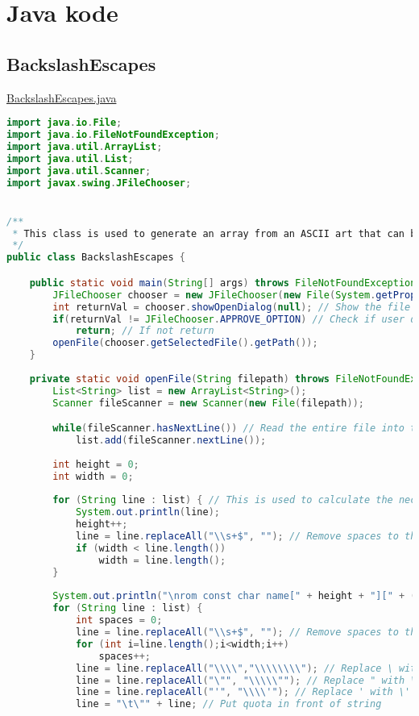 \chapter{Java kode}

\section{BackslashEscapes}
\label{BackslashEscapes}

\underline{BackslashEscapes.java}
\begin{lstlisting}[language=Java]
import java.io.File;
import java.io.FileNotFoundException;
import java.util.ArrayList;
import java.util.List;
import java.util.Scanner;
import javax.swing.JFileChooser;


/**
 * This class is used to generate an array from an ASCII art that can be put directly into the .c file.
 */
public class BackslashEscapes {

	public static void main(String[] args) throws FileNotFoundException {
		JFileChooser chooser = new JFileChooser(new File(System.getProperty("user.home"))); // Create the FileChooser instance 
		int returnVal = chooser.showOpenDialog(null); // Show the file dialog
		if(returnVal != JFileChooser.APPROVE_OPTION) // Check if user didn't press OK
			return; // If not return
		openFile(chooser.getSelectedFile().getPath());
	}
	
	private static void openFile(String filepath) throws FileNotFoundException {
		List<String> list = new ArrayList<String>();
		Scanner fileScanner = new Scanner(new File(filepath));

		while(fileScanner.hasNextLine()) // Read the entire file into the list
			list.add(fileScanner.nextLine());
		
		int height = 0;
		int width = 0;
		
		for (String line : list) { // This is used to calculate the necessary height and width of the array
			System.out.println(line);
			height++;
			line = line.replaceAll("\\s+$", ""); // Remove spaces to the right
			if (width < line.length())
				width = line.length();
		}
		
		System.out.println("\nrom const char name[" + height + "][" + (width+1) + "] = {"); // Make room for null-character
		for (String line : list) {
			int spaces = 0;			
			line = line.replaceAll("\\s+$", ""); // Remove spaces to the right
			for (int i=line.length();i<width;i++)
				spaces++;
			line = line.replaceAll("\\\\","\\\\\\\\"); // Replace \ with \\
			line = line.replaceAll("\"", "\\\\\""); // Replace " with \"
			line = line.replaceAll("'", "\\\\'"); // Replace ' with \'
			line = "\t\"" + line; // Put quota in front of string 
			

\end{lstlisting}
